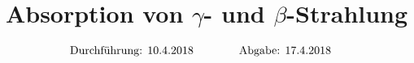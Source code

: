 

\subject{V704}
\title{Absorption von \texorpdfstring{$\gamma$}{gamma}- und \texorpdfstring{$\beta$}{beta}-Strahlung}

\date{
  \begin{align}
    \text{Durchführung: } & \text{10.4.2018} & \hspace{3em} & \text{Abgabe: 17.4.2018} \notag
  \end{align}
}




\maketitle
\thispagestyle{empty}
\tableofcontents
\newpage






\nocite{*}
\printbibliography{}


